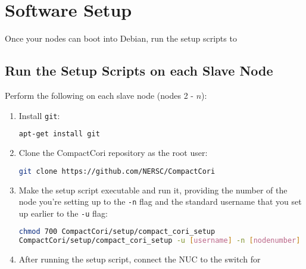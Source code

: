 \documentclass{article}
\begin{document}
\section{Software Setup}
    Once your nodes can boot into Debian, run the setup scripts to
    \subsection{Run the Setup Scripts on each Slave Node}
    Perform the following on each slave node (nodes 2 - $n$):
        \begin{enumerate}
            \item Install \texttt{git}:\\
                \begin{lstlisting}[language=bash]
apt-get install git
                \end{lstlisting}

            \item Clone the CompactCori repository as the root user:\\
                \begin{lstlisting}[language=bash]
git clone https://github.com/NERSC/CompactCori
                \end{lstlisting}
            \item Make the setup script executable and run it, providing the number
                of the node you're setting up to the \texttt{-n} flag and the
                standard username that you set up earlier to the \texttt{-u} flag:
                \begin{lstlisting}[language=bash]
chmod 700 CompactCori/setup/compact_cori_setup
CompactCori/setup/compact_cori_setup -u [username] -n [nodenumber]
                \end{lstlisting}
            \item After running the setup script, connect the NUC to the switch for
        \end{enumerate}
\end{document}
